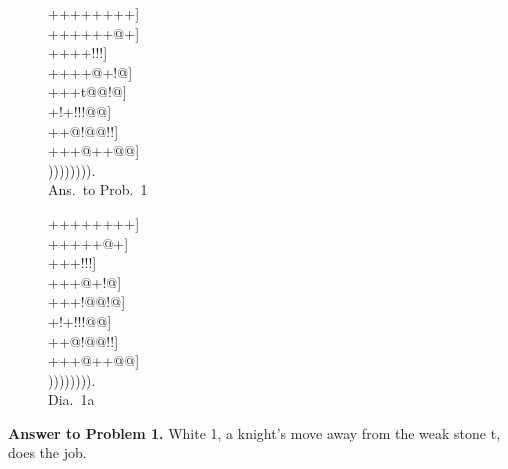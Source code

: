 \documentclass[mcrownvopaper,10pt,twopage,onecolumn,final]{memoir}
\begin{document}
\begin{figure}[ht]
    \begin{minipage}[c]{0.5\linewidth}
        \centering    
        {\gnos%
        ++++++++]\\
        ++++++@+]\\
        ++{\gnosw{}}++!!!]\\
        ++++@+!@]\\
        +++t@@!@]\\
        +!+!!!@@]\\
        ++@!@@!!]\\
        +++@++@@]\\
        )))))))).\\
        }
        Ans.\ to Prob.\ 1
    \end{minipage}%
    \begin{minipage}[c]{0.5\linewidth}
        \centering    
        {\gnos%
        ++++++++]\\
        +++{\gnosw{}}++@+]\\
        ++{\gnosb{}}{\gnosw{}}+!!!]\\
        +++{\gnosb{}}@+!@]\\
        +++!@@!@]\\
        +!+!!!@@]\\
        ++@!@@!!]\\
        +++@++@@]\\
        )))))))).\\
        }
        Dia.\ 1a
    \end{minipage}
\end{figure}
\noindent
\textbf{Answer to Problem 1.} White 1, a knight's move away from the weak
stone {\gnos t}, does the job.
\end{document}
